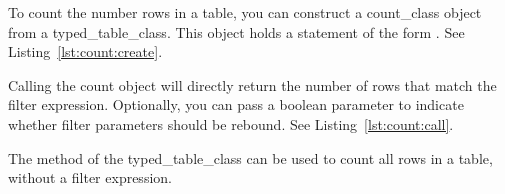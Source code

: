 To count the number rows in a table, you can construct a \gls{count_class} object from a \gls{typed_table_class}. This object holds a statement of the form . See Listing~\ref{lst:count:create}.



Calling the count object will directly return the number of rows that match the filter expression. Optionally, you can pass a boolean parameter to indicate whether filter parameters should be rebound. See Listing~\ref{lst:count:call}.



The  method of the \gls{typed_table_class} can be used to count all rows in a table, without a filter expression.